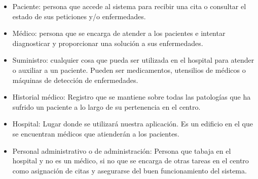 \documentclass[11pt]{article}
\begin{document}
\begin{itemize}
\item Paciente: persona que accede al sistema para recibir una cita o consultar el estado de sus peticiones y/o enfermedades.
\item Médico: persona que se encarga de atender a los pacientes e intentar diagnosticar y proporcionar una solución a sus enfermedades.
\item Suministro: cualquier cosa que pueda ser utilizada en el hospital para atender o auxiliar a un paciente. Pueden ser medicamentos, 
utensilios de médicos o máquinas de detección de enfermedades.
\item Historial médico: Registro que se mantiene sobre todas las patologías que ha sufrido un paciente a lo largo de su pertenencia en el centro.
\item Hospital: Lugar donde se utilizará nuestra aplicación. Es un edificio en el que se encuentran médicos que atienderán a los pacientes.
\item Personal administrativo o de administración: Persona que tabaja en el hospital y no es un médico, si no que se encarga de otras tareas en el centro como asignación de citas y asegurarse del buen funcionamiento del sistema.
\end{itemize}
\end{document}
